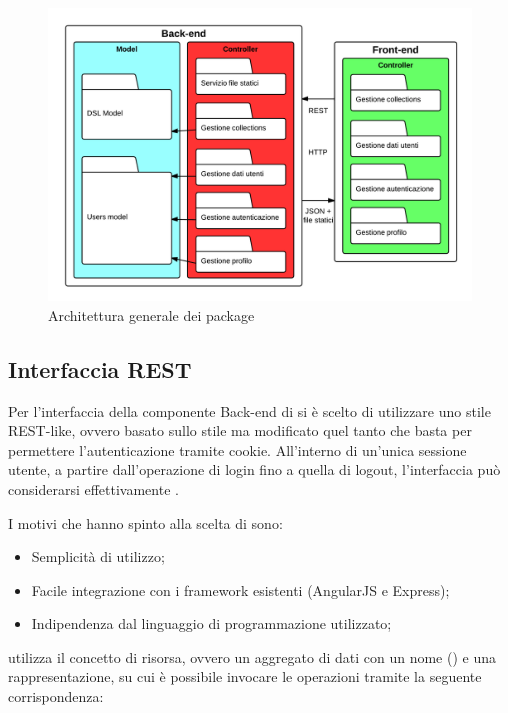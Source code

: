 \begin{figure}[H] %
\centering
\includegraphics[width=\textwidth]{uml/architettura-generale-package.png}
\caption{Architettura generale dei package}
\label{architetturaGeneralePackage}
\end{figure}

\subsection{Interfaccia REST}
Per l'interfaccia della componente Back-end di \ProjectName{} si è scelto di utilizzare uno stile REST-like, ovvero basato sullo stile  ma modificato quel tanto che basta per permettere l'autenticazione tramite cookie. All'interno di un'unica sessione utente, a partire dall'operazione di login fino a quella di logout, l'interfaccia può considerarsi effettivamente .

I motivi che hanno spinto alla scelta di  sono:
\begin{itemize}
	\item Semplicità di utilizzo;
	\item Facile integrazione con i framework esistenti (AngularJS e Express);
	\item Indipendenza dal linguaggio di programmazione utilizzato;
\end{itemize}

 utilizza il concetto di risorsa, ovvero un aggregato di dati con un nome () e una rappresentazione, su cui è possibile invocare le operazioni  tramite la seguente corrispondenza:

